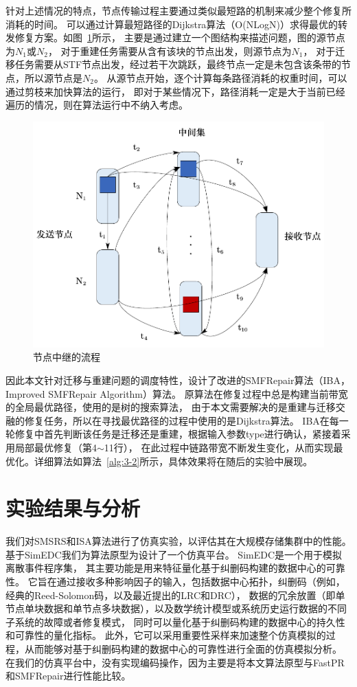 针对上述情况的特点，节点传输过程主要通过类似最短路的机制来减少整个修复所消耗的时间。
可以通过计算最短路径的Dijkstra算法（O(NLogN)）求得最优的转发修复方案。如图~\ref{fig:3.7}所示，
主要是通过建立一个图结构来描述问题，图的源节点为$N_1$或$N_2$，
对于重建任务需要从含有该块的节点出发，则源节点为$N_1$，
对于迁移任务需要从STF节点出发，经过若干次跳跃，最终节点一定是未包含该条带的节点，所以源节点是$N_2$。
从源节点开始，逐个计算每条路径消耗的权重时间，可以通过剪枝来加快算法的运行，
即对于某些情况下，路径消耗一定是大于当前已经遍历的情况，则在算法运行中不纳入考虑。
\begin{figure}[htbp]
	\centering
	\includegraphics [scale=0.5]{figures/3.7.pdf}
	\caption{节点中继的流程}
	\label{fig:3.7}
\end{figure}


因此本文针对迁移与重建问题的调度特性，设计了改进的SMFRepair算法（IBA，Improved SMFRepair Algorithm）算法。
原算法在修复过程中总是构建当前带宽的全局最优路径，使用的是树的搜索算法，
由于本文需要解决的是重建与迁移交融的修复任务，所以在寻找最优路径的过程中使用的是Dijkstra算法。
IBA在每一轮修复中首先判断该任务是迁移还是重建，根据输入参数type进行确认，紧接着采用局部最优修复（第4$\sim$11行），
在此过程中链路带宽不断发生变化，从而实现最优化。详细算法如算法~\ref{alg:3-2}所示，具体效果将在随后的实验中展现。




\section{实验结果与分析}
我们对SMSRS和ISA算法进行了仿真实验，以评估其在大规模存储集群中的性能。
基于SimEDC\cite{zhang2019simedc}我们为算法原型为设计了一个仿真平台。
SimEDC是一个用于模拟离散事件程序集，
其主要功能是用来特征量化基于纠删码构建的数据中心的可靠性。
它旨在通过接收多种影响因子的输入，包括数据中心拓扑，纠删码（例如，经典的Reed-Solomon码，以及最近提出的LRC和DRC），
数据的冗余放置（即单节点单块数据和单节点多块数据），以及数学统计模型或系统历史运行数据的不同子系统的故障或者修复模式，
同时可以量化基于纠删码构建的数据中心的持久性和可靠性的量化指标。
此外，它可以采用重要性采样来加速整个仿真模拟的过程，从而能够对基于纠删码构建的数据中心的可靠性进行全面的仿真模拟分析。
在我们的仿真平台中，没有实现编码操作，因为主要是将本文算法原型与FastPR和SMFRepair进行性能比较。

